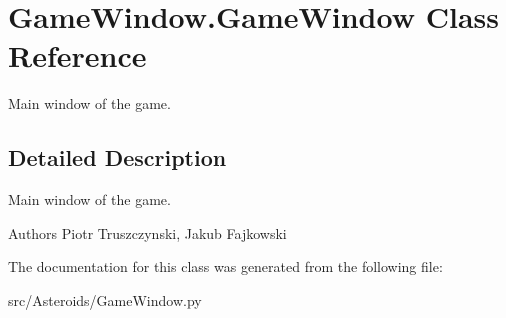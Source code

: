 \hypertarget{classGameWindow_1_1GameWindow}{}\section{Game\+Window.\+Game\+Window Class Reference}
\label{classGameWindow_1_1GameWindow}


Main window of the game.  




\subsection{Detailed Description}
Main window of the game. 

\begin{DoxyAuthor}{Authors}
Piotr Truszczynski, Jakub Fajkowski 
\end{DoxyAuthor}


The documentation for this class was generated from the following file\+:\begin{DoxyCompactItemize}
\item 
src/\+Asteroids/Game\+Window.\+py\end{DoxyCompactItemize}

